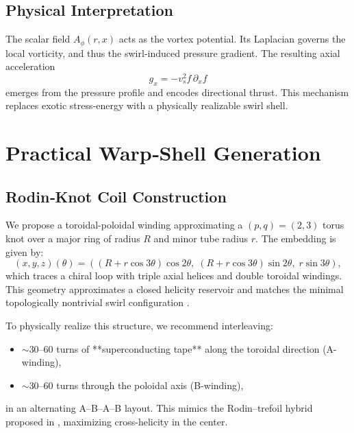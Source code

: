 \documentclass[preprint,notitlepage]{revtex4-2}
\begin{document}
    \subsection{Physical Interpretation}
    The scalar field $A_\phi(r,x)$ acts as the vortex potential. Its Laplacian governs the local vorticity, and thus the swirl‐induced pressure gradient. The resulting axial acceleration
    \begin{equation}
      g_x = -v_s^2 f \, \partial_x f
    \end{equation}
    emerges from the pressure profile and encodes directional thrust. This mechanism replaces exotic stress‐energy with a physically realizable swirl shell.

\section{Practical Warp‐Shell Generation}
    
    \subsection{Rodin‐Knot Coil Construction}
    
    We propose a toroidal-poloidal winding approximating a $(p,q) = (2,3)$ torus knot over a major ring of radius $R$ and minor tube radius $r$. The embedding is given by:
    \begin{equation}
    (x, y, z)(\theta) = \left( (R + r\cos 3\theta)\cos 2\theta,\; (R + r\cos 3\theta)\sin 2\theta,\; r\sin 3\theta \right),
    \end{equation}
    which traces a chiral loop with triple axial helices and double toroidal windings. This geometry approximates a closed helicity reservoir and matches the minimal topologically nontrivial swirl configuration \cite{VAM10}.
    
    To physically realize this structure, we recommend interleaving:
    \begin{itemize}
        \item $\sim$30–60 turns of **superconducting tape** along the toroidal direction (A-winding),
        \item $\sim$30–60 turns through the poloidal axis (B-winding),
    \end{itemize}
    in an alternating A–B–A–B layout. This mimics the Rodin–trefoil hybrid proposed in \cite{VAM6, VAM10}, maximizing cross-helicity in the center.
    
\end{document}
